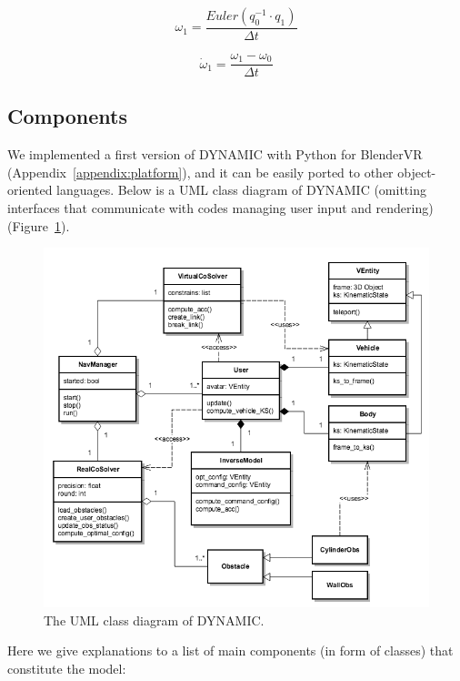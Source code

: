 \begin{equation}
\omega_{1}=\frac{Euler(q_{0}^{-1} \cdot q_{1})}{\Delta t}
\end{equation}

\begin{equation}
\dot{\omega}_{1}=\frac{\omega_{1}-\omega_{0}}{\Delta t}
\end{equation}


\subsection{Components}
We implemented a first version of DYNAMIC with Python for BlenderVR (Appendix~\ref{appendix:platform}), and it can be easily ported to other object-oriented languages. Below is a UML class diagram of DYNAMIC (omitting interfaces that communicate with codes managing user input and rendering)(Figure~\ref{fig:5_uml}).

\begin{figure}[htb]
  \centering
  \includegraphics[width=.9\textwidth]{figures/ch5/uml}
  \caption{\label{fig:5_uml}The UML class diagram of DYNAMIC.}
\end{figure}


Here we give explanations to a list of main components (in form of classes) that constitute the model:

